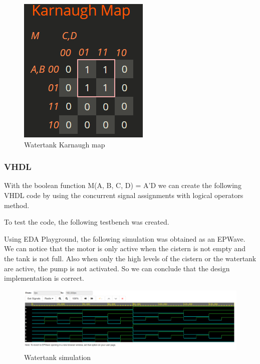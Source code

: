 \documentclass{article}
\begin{document}
\begin{multicols}{2}
	\begin{figure}[H]
		\centering
		\includegraphics[width=0.8\linewidth]{images/k-maps/watertank.png}
		\caption{Watertank Karnaugh map}
		\label{Watertank Karnaugh map solution}
	\end{figure}

	\subsubsection*{VHDL}\label{Watertank VHDL}

	With the boolean function M(A, B, C, D) = A'D we can create the following VHDL code by using the concurrent signal assignments with logical operators method.

	

	To test the code, the following testbench was created.

	

	Using EDA Playground, the following simulation was obtained as an EPWave. We can notice that the motor is only active when the cistern is not empty and the tank is not full. Also when only the high levels of the cistern or the watertank are active, the pump is not activated. So we can conclude that the design implementation is correct.

	\begin{figure}[H]
		\centering
		\includegraphics[width=1\linewidth]{images/waves/watertank.png}
		\caption{Watertank simulation}
		\label{Watertank simulation}
	\end{figure}


\end{multicols}
\end{document}
